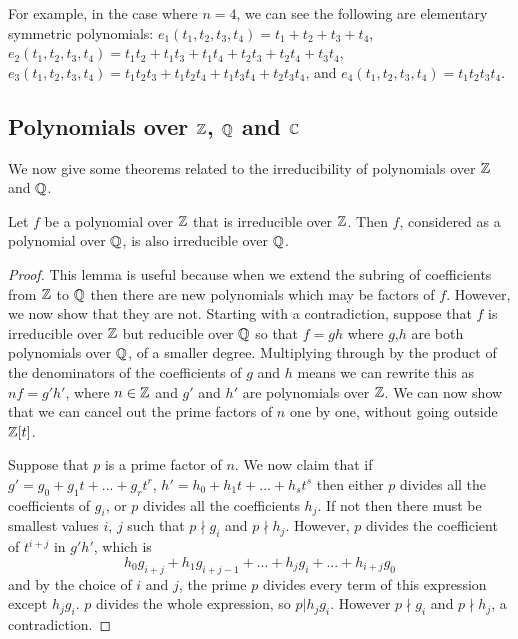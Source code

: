 \begin{example}
    For example, in the case where $n=4$, we can see the following are elementary symmetric polynomials: $e_1(t_1,t_2,t_3,t_4) = t_1 + t_2 + t_3 + t_4$, $e_2(t_1, t_2, t_3, t_4) = t_1t_2 + t_1t_3 + t_1t_4 + t_2t_3 + t_2t_4 + t_3t_4$,  $e_3(t_1,t_2,t_3,t_4) = t_1t_2t_3+t_1t_2t_4+t_1t_3t_4+t_2t_3t_4$, and $e_4(t_1, t_2, t_3, t_4) = t_1 t_2 t_3 t_4$. 
\end{example}


\subsection{Polynomials over $\mathbb Z$, $\mathbb Q$ and $\mathbb C$} 
We now give some theorems related to the irreducibility of polynomials over $\mathbb Z$ and $\mathbb Q$.

\begin{lemma}
     Let $f$ be a polynomial over $\mathbb Z$ that is irreducible over $\mathbb Z$. Then $f$, considered as a polynomial over $\mathbb Q$, is also irreducible over $\mathbb Q$.
\end{lemma}

\begin{proof}
This lemma is useful because when we extend the subring of coefficients from $\mathbb Z$ to $\mathbb Q$ then there are new polynomials which may be factors of $f$. However, we now show that they are not. Starting with a contradiction, suppose that $f$ is irreducible over $\mathbb Z$ but reducible over $\mathbb Q$ so that $f = g h$ where $g$,$h$ are both polynomials over $\mathbb Q$, of a smaller degree. Multiplying through by the product of the denominators of the coefficients of $g$ and $h$ means we can rewrite this as $n f = g' h'$, where $n \in \mathbb Z$ and $g'$ and $h'$ are polynomials over $\mathbb Z$. We can now show that we can cancel out the prime factors of $n$ one by one, without going outside $\mathbb Z[t]$.

Suppose that $p$ is a prime factor of $n$. We now claim that if $g' = g_0 + g_1 t +...+ g_r t^r$, $h' = h_0 + h_1 t +...+ h_s t^s$ then either $p$ divides all the coefficients of $g_i$, or $p$ divides all the coefficients $h_j$.
If not then there must be smallest values $i$, $j$ such that $p \nmid g_i$ and $p \nmid h_j$. However, $p$ divides the coefficient of $t^{i+j}$ in $g' h'$, which is
$$
h_0 g_{i+j} + h_1 g_{i+j-1} +...+ h_j g_i +...+ h_{i+j} g_0
$$
and by the choice of $i$ and $j$, the prime $p$ divides every term of this expression except $h_j g_i$. $p$ divides the whole expression, so $p | h_j g_i$. However $p \nmid g_i$ and $p \nmid h_j$, a contradiction.
\end{proof}

